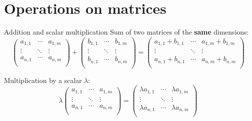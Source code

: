 \documentclass{beamer}
\begin{document}
\section{Operations on matrices}

\begin{frame}[t]{Addition and scalar multiplication}
	Sum of two matrices of the \textbf{same} dimensions:
	{\small
		$$
		\!\!\!\!\!\!\!\!\!\!\!\!
		\begin{pmatrix}
			a_{1,1}  & \cdots & a_{1,m} \\
			\vdots & \ddots & \vdots \\
			a_{n,1} & \cdots & a_{n,m} \\
		\end{pmatrix}
		+
		\begin{pmatrix}
			b_{1,1}  & \cdots & b_{1,m} \\
			\vdots & \ddots & \vdots \\
			b_{n,1} & \cdots & b_{n,m} \\
		\end{pmatrix}
		=
		\begin{pmatrix}
			a_{1,1} + b_{1,1}  & \cdots & a_{1,m} + b_{1,m} \\
			\vdots & \ddots & \vdots \\
			a_{n,1} + b_{n,1} & \cdots & a_{n,m} + b_{n,m} \\
		\end{pmatrix}
		$$
	}

	\vspace{2cm}
	{
		Multiplication by a scalar $\lambda$:
		$$
		\lambda
		\begin{pmatrix}
			a_{1,1}  & \cdots & a_{1,m} \\
			\vdots & \ddots & \vdots \\
			a_{n,1} & \cdots & a_{n,m} \\
		\end{pmatrix}
		=
		\begin{pmatrix}
			\lambda a_{1,1}  & \cdots & \lambda a_{1,m} \\
			\vdots & \ddots & \vdots \\
			\lambda a_{n,1} & \cdots & \lambda a_{n,m} \\
		\end{pmatrix}
		$$
	}
\end{frame}
\end{document}
